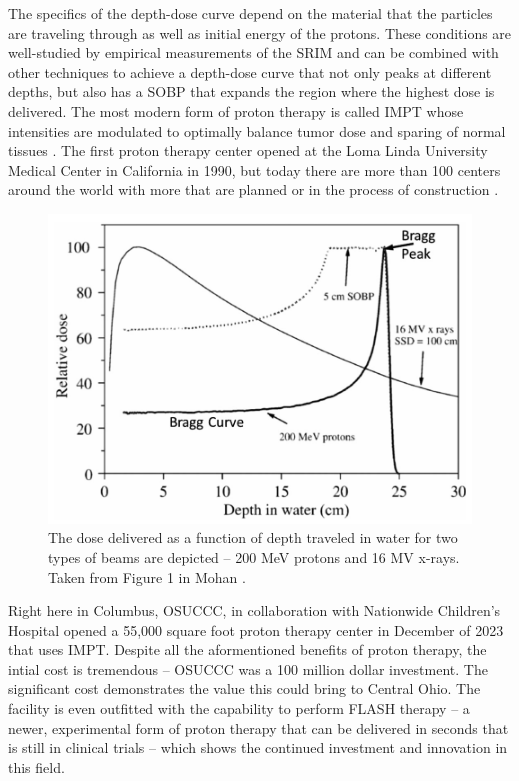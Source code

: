The specifics of the depth-dose curve depend on the material that the particles are traveling through as well as initial energy of the protons. These conditions are well-studied by empirical measurements of the \gls{SRIM} \cite{Ziegler_2010_SRIM} and can be combined with other techniques to achieve a depth-dose curve that not only peaks at different depths, but also has a \gls{SOBP} that expands the region where the highest dose is delivered. The most modern form of proton therapy is called \gls{IMPT} whose intensities are modulated to optimally balance tumor dose and sparing of normal tissues \cite{Mohan_2022_PRO}. The first proton therapy center opened at the Loma Linda University Medical Center in California in 1990, but today there are more than 100 centers around the world with more that are planned or in the process of construction \cite{Mohan_2022_PRO}. 

\begin{figure}
	\centering
	\includegraphics[width=0.75\linewidth]{planning/images/bragg_curve.PNG}
	\caption{The dose delivered as a function of depth traveled in water for two types of beams are depicted -- 200 MeV protons and 16 MV x-rays. Taken from Figure 1 in Mohan \cite{Mohan_2022_PRO}.}
	\label{fig:bragg_curve}
\end{figure}
 
Right here in Columbus, \gls{OSUCCC}, in collaboration with Nationwide Children's Hospital opened a 55,000 square foot proton therapy center in December of 2023 \cite{OSU_CCC} that uses \gls{IMPT}. Despite all the aformentioned benefits of proton therapy, the intial cost is tremendous -- \gls{OSUCCC} was a 100 million dollar investment. The significant cost demonstrates the value this could bring to Central Ohio. The facility is even outfitted with the capability to perform FLASH therapy -- a newer, experimental form of proton therapy that can be delivered in seconds that is still in clinical trials \cite{OSU_CCC} -- which shows the continued investment and innovation in this field. 

